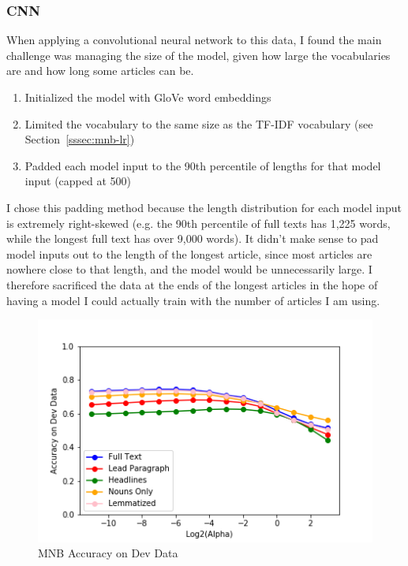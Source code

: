 \documentclass[11pt,a4paper,table]{article}
\begin{document}
\subsubsection{CNN}
\label{sssec:cnn}

When applying a convolutional neural network to this data, I found the main challenge was managing the size of the model, given how large the vocabularies are and how long some articles can be. 

\begin{enumerate}
\item Initialized the model with GloVe word embeddings \cite{GloVe}
\item Limited the vocabulary to the same size as the TF-IDF vocabulary (see Section~\ref{sssec:mnb-lr})
\item Padded each model input to the 90th percentile of lengths for that model input (capped at 500)
\end{enumerate}

I chose this padding method because the length distribution for each model input is extremely right-skewed (e.g. the 90th percentile of full texts has 1,225 words, while the longest full text has over 9,000 words). It didn't make sense to pad model inputs out to the length of the longest article, since most articles are nowhere close to that length, and the model would be unnecessarily large. I therefore sacrificed the data at the ends of the longest articles in the hope of having a model I could actually train with the number of articles I am using.

\begin{figure}
\centering
\includegraphics[scale=0.55]{mnb_accuracy}
\caption{MNB Accuracy on Dev Data}
\label{fig:mnb-acc}
\end{figure}
\end{document}
